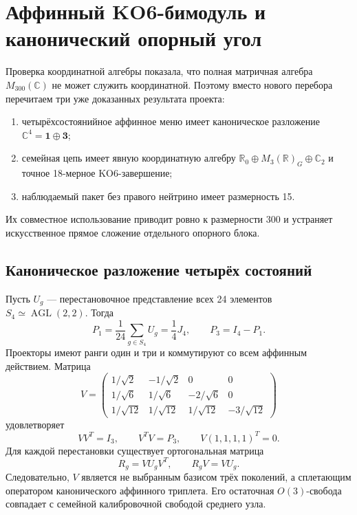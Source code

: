 \chapter{Аффинный KO6-бимодуль и канонический опорный угол}

Проверка координатной алгебры показала, что полная матричная алгебра
$M_{300}(\mathbb C)$ не может служить координатной. Поэтому вместо нового
перебора перечитаем три уже доказанных результата проекта:
\begin{enumerate}
 \item четырёхсостоянийное аффинное меню имеет каноническое разложение
 $\mathbb C^4=\mathbf1\oplus\mathbf3$;
 \item семейная цепь имеет явную координатную алгебру
 $\mathbb R_0\oplus M_3(\mathbb R)_G\oplus\mathbb C_2$ и точное
 18-мерное KO6-завершение;
 \item наблюдаемый пакет без правого нейтрино имеет размерность 15.
\end{enumerate}
Их совместное использование приводит ровно к размерности 300 и устраняет
искусственное прямое сложение отдельного опорного блока.

\section{Каноническое разложение четырёх состояний}

Пусть $U_g$ --- перестановочное представление всех 24 элементов
$S_4\simeq\operatorname{AGL}(2,2)$. Тогда
\begin{equation}
 P_1=\frac1{24}\sum_{g\in S_4}U_g=\frac14J_4,
 \qquad
 P_3=I_4-P_1.
 \label{eq:v5-affine-p1-p3}
\end{equation}
Проекторы имеют ранги один и три и коммутируют со всем аффинным действием.
Матрица
\begin{equation}
 V=
 \begin{pmatrix}
  1/\sqrt2&-1/\sqrt2&0&0\\
  1/\sqrt6&1/\sqrt6&-2/\sqrt6&0\\
  1/\sqrt{12}&1/\sqrt{12}&1/\sqrt{12}&-3/\sqrt{12}
 \end{pmatrix}
 \label{eq:v5-affine-coisometry}
\end{equation}
удовлетворяет
\begin{equation}
 VV^T=I_3,
 \qquad
 V^TV=P_3,
 \qquad
 V(1,1,1,1)^T=0.
\end{equation}
Для каждой перестановки существует ортогональная матрица
\begin{equation}
 R_g=VU_gV^T,
 \qquad
 R_gV=VU_g.
\end{equation}
Следовательно, $V$ является не выбранным базисом трёх поколений, а
сплетающим оператором канонического аффинного триплета. Его остаточная
$O(3)$-свобода совпадает с семейной калибровочной свободой среднего узла.

